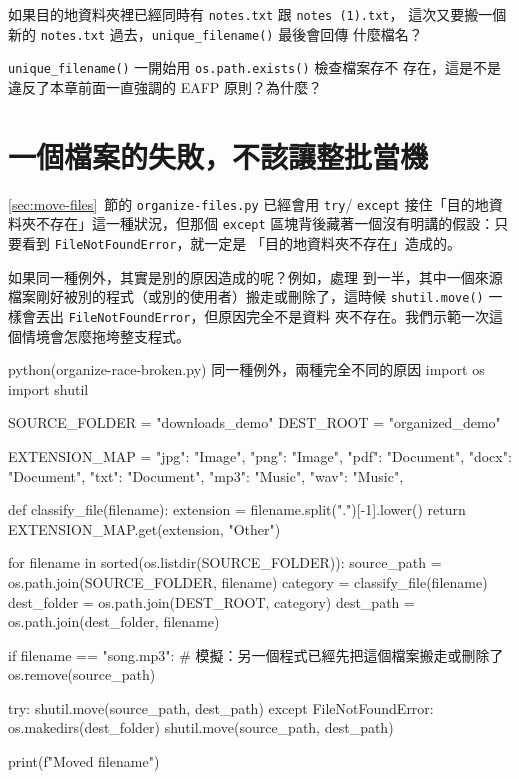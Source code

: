 \begin{drills}[label=drills:avoid-overwrite]
\item 如果目的地資料夾裡已經同時有 \texttt{notes.txt} 跟 \texttt{notes (1).txt}，
這次又要搬一個新的 \texttt{notes.txt} 過去，\texttt{unique\_filename()} 最後會回傳
什麼檔名？
\item \texttt{unique\_filename()} 一開始用 \texttt{os.path.exists()} 檢查檔案存不
存在，這是不是違反了本章前面一直強調的 EAFP 原則？為什麼？
\end{drills}

\section{一個檔案的失敗，不該讓整批當機}
\label{sec:robust-errors}

\ref{sec:move-files}~節的 \texttt{organize-files.py} 已經會用 \texttt{try}/
\texttt{except} 接住「目的地資料夾不存在」這一種狀況，但那個 \texttt{except}
區塊背後藏著一個沒有明講的假設：只要看到 \texttt{FileNotFoundError}，就一定是
「目的地資料夾不存在」造成的。

如果同一種例外，其實是別的原因造成的呢？例如，處理
到一半，其中一個來源檔案剛好被別的程式（或別的使用者）搬走或刪除了，這時候
\texttt{shutil.move()} 一樣會丟出 \texttt{FileNotFoundError}，但原因完全不是資料
夾不存在。我們示範一次這個情境會怎麼拖垮整支程式。

\begin{example}{python}{(organize-race-broken.py) 同一種例外，兩種完全不同的原因}
import os
import shutil

SOURCE_FOLDER = "downloads_demo"
DEST_ROOT = "organized_demo"

EXTENSION_MAP = {
    "jpg": "Image", "png": "Image",
    "pdf": "Document", "docx": "Document", "txt": "Document",
    "mp3": "Music", "wav": "Music",
}


def classify_file(filename):
    extension = filename.split(".")[-1].lower()
    return EXTENSION_MAP.get(extension, "Other")


for filename in sorted(os.listdir(SOURCE_FOLDER)):
    source_path = os.path.join(SOURCE_FOLDER, filename)
    category = classify_file(filename)
    dest_folder = os.path.join(DEST_ROOT, category)
    dest_path = os.path.join(dest_folder, filename)

    if filename == "song.mp3":
        # 模擬：另一個程式已經先把這個檔案搬走或刪除了
        os.remove(source_path)

    try:
        shutil.move(source_path, dest_path)
    except FileNotFoundError:
        os.makedirs(dest_folder)
        shutil.move(source_path, dest_path)

    print(f"Moved {filename}")
\end{example}

